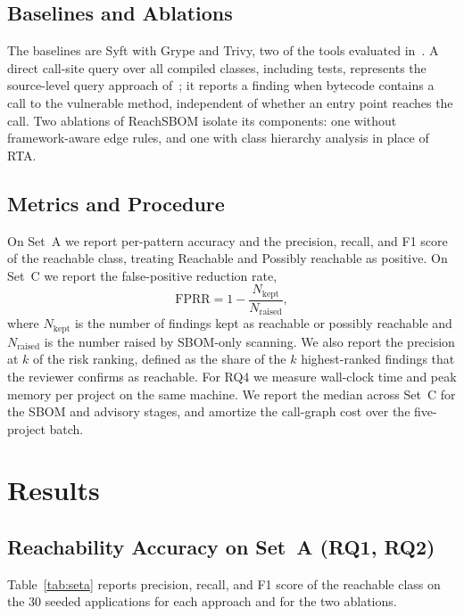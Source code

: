 \documentclass[conference]{IEEEtran}
\begin{document}
\subsection{Baselines and Ablations}
The baselines are Syft with Grype and Trivy, two of the tools evaluated in~\cite{grgic}. A direct call-site query over all compiled classes, including tests, represents the source-level query approach of~\cite{grgic}; it reports a finding when bytecode contains a call to the vulnerable method, independent of whether an entry point reaches the call. Two ablations of ReachSBOM isolate its components: one without framework-aware edge rules, and one with class hierarchy analysis in place of RTA.

\subsection{Metrics and Procedure}
On Set~A we report per-pattern accuracy and the precision, recall, and F1 score of the reachable class, treating Reachable and Possibly reachable as positive. On Set~C we report the false-positive reduction rate,
\begin{equation}
\mathrm{FPRR} = 1 - \frac{N_{\text{kept}}}{N_{\text{raised}}},
\end{equation}
where $N_{\text{kept}}$ is the number of findings kept as reachable or possibly reachable and $N_{\text{raised}}$ is the number raised by SBOM-only scanning. We also report the precision at $k$ of the risk ranking, defined as the share of the $k$ highest-ranked findings that the reviewer confirms as reachable. For RQ4 we measure wall-clock time and peak memory per project on the same machine. We report the median across Set~C for the SBOM and advisory stages, and amortize the call-graph cost over the five-project batch.

\section{Results}\label{sec:results}

\subsection{Reachability Accuracy on Set~A (RQ1, RQ2)}
Table~\ref{tab:seta} reports precision, recall, and F1 score of the reachable class on the 30 seeded applications for each approach and for the two ablations.
\end{document}
